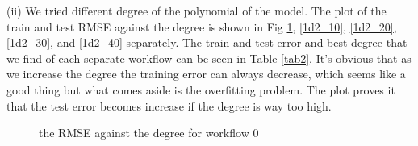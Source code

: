 \documentclass{article}
\begin{document}
(ii) We tried different degree of the polynomial of the model. The plot of the train and test RMSE against the degree is shown in Fig \ref{1d2_00}, \ref{1d2_10}, \ref{1d2_20}, \ref{1d2_30}, and \ref{1d2_40} separately. The train and test error and best degree that we find of each separate workflow can be seen in Table \ref{tab2}. It's obvious that as we increase the degree the training error can always decrease, which seems like a good thing but what comes aside is the overfitting problem. The plot proves it that the test error becomes increase if the degree is way too high.

\begin{table}[h]
\center
\caption{Train and test RMSE and best degree}
\label{tab2}
\end{table}


\begin{figure}[!htbp]
\centering
{}
\caption{the RMSE against the degree for workflow $0$} \label{1d2_00}
\end{figure}
\end{document}
